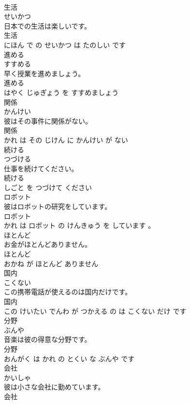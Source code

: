 \documentclass[8pt]{extreport}
\begin{document}
\begin{CJK}{UTF8}{min}
\\	生活	
\\	せいかつ			
\\	日本での生活は楽しいです。	
\\	生活 
\\	にほん で の せいかつ は たのしい です			
\\	進める	
\\	すすめる			
\\	早く授業を進めましょう。	
\\	進める 
\\	はやく じゅぎょう を すすめましょう			
\\	関係	
\\	かんけい			
\\	彼はその事件に関係がない。	
\\	関係 
\\	かれ は その じけん に かんけい が ない			
\\	続ける	
\\	つづける			
\\	仕事を続けてください。	
\\	続ける 
\\	しごと を つづけて ください			
\\	ロボット	
\\	彼はロボットの研究をしています。	
\\	ロボット 
\\	かれ は ロボット の けんきゅう を しています 。			
\\	ほとんど	
\\	お金がほとんどありません。	
\\	ほとんど 
\\	おかね が ほとんど ありません			
\\	国内	
\\	こくない			
\\	この携帯電話が使えるのは国内だけです。	
\\	国内 
\\	この けいたい でんわ が つかえる の は こくない だけ です			
\\	分野	
\\	ぶんや			
\\	音楽は彼の得意な分野です。	
\\	分野 
\\	おんがく は かれ の とくい な ぶんや です			
\\	会社	
\\	かいしゃ			
\\	彼は小さな会社に勤めています。	
\\	会社 

\end{CJK}
\end{document}
